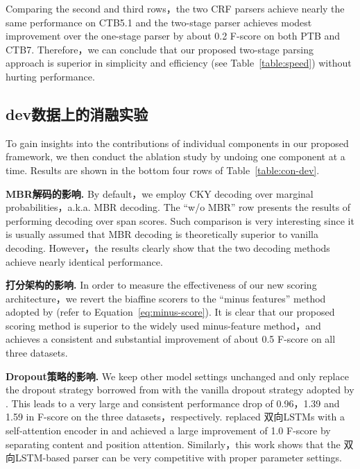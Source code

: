 Comparing the second and third rows，the two CRF parsers achieve nearly the same performance on CTB5.1 and the two-stage parser achieves modest improvement over the one-stage parser by about 0.2 F-score on both PTB and CTB7.
Therefore，we can conclude that our proposed two-stage parsing approach is superior in simplicity and efficiency (see Table~\ref{table:speed}) without hurting performance.




\subsection{dev数据上的消融实验}

To gain insights into the contributions of individual components in our proposed framework,
we then conduct the ablation study by undoing one component at a time. %
Results are shown in the bottom four rows of Table~\ref{table:con-dev}.

\noindent\textbf{MBR解码的影响.}
By default，we employ CKY decoding over marginal probabilities，a.k.a. MBR decoding.
The ``w/o MBR'' row presents the results of performing decoding over span scores.
Such comparison is very interesting since it is usually assumed that MBR decoding is theoretically superior to vanilla decoding.
However，the results clearly show that
the two decoding methods achieve nearly identical performance.

\noindent\textbf{打分架构的影响.}
In order to measure the effectiveness of our new scoring architecture，we revert the biaffine scorers to the ``minus features'' method adopted by \cite{stern-etal-2017-minimal} (refer to Equation~\ref{eq:minus-score}).
It is clear that our proposed scoring method is superior to the widely used minus-feature method，and
achieves a consistent and substantial improvement of about 0.5 F-score on all three datasets.

\noindent\textbf{Dropout策略的影响.}
We keep other model settings unchanged and only replace the dropout strategy borrowed from \cite{Timothy-d17-biaffine} with the vanilla dropout strategy adopted by \cite{stern-etal-2017-minimal}.
This leads to a very large and consistent performance drop of 0.96，1.39 and 1.59 in F-score on the three datasets，respectively.
\cite{kitaev-klein-2018-constituency} replaced 双向LSTMs with a self-attention encoder in \cite{stern-etal-2017-minimal} and achieved a large improvement of 1.0 F-score by separating content and position attention.
Similarly，this work shows that the 双向LSTM-based parser can be very competitive with proper parameter settings.

